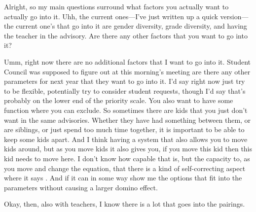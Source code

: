 \documentclass[appendix.tex]{subfiles}
\begin{document}
Alright, so my main questions surround what factors you actually want to actually go into it.
Uhh, the current ones---I've just written up a quick version---the current one's that go into it are gender diversity, grade diversity, and having the teacher in the advisory.
Are there any other factors that you want to go into it?

Umm, right now there are no additional factors that I want to go into it.
Student Council was supposed to figure out at this morning's meeting are there any other parameters for next year that they want to go into it.
I'd say right now just try to be flexible, potentially try to consider student requests, though I'd say that's probably on the lower end of the priority scale.
You also want to have some function where you can exclude.
So sometimes there are kids that you just don't want in the same advisories.
Whether they have had something between them, or are siblings, or just spend too much time together, it is important to be able to keep some kids apart.
And I think having a system that also allows you to move kids around, but as you move kids it also gives you, if you move this kid then this kid needs to move here.
I don't know how capable that is, but the capacity to, as you move and change the equation, that there is a kind of self-correcting aspect where it says .
And if it can in some way show me the options that fit into the parameters without causing a larger domino effect.

Okay, then, also with teachers, I know there is a lot that goes into the pairings.
\end{document}
